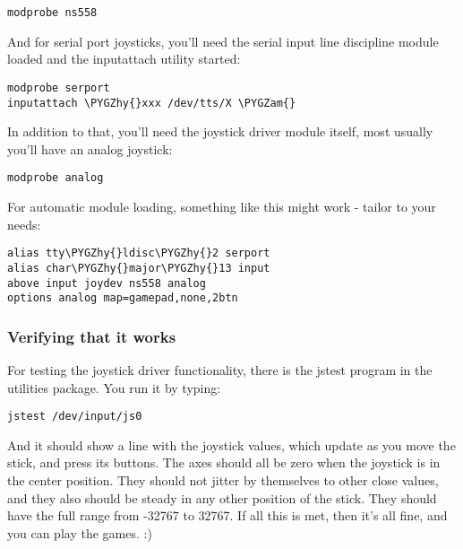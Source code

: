 \documentclass[a4paper,8pt,english]{sphinxmanual}
\def\PYGZam{\char`\&}
\def\PYGZhy{\char`\-}
\begin{document}
\begin{Verbatim}[commandchars=\\\{\}]
modprobe ns558
\end{Verbatim}

And for serial port joysticks, you'll need the serial input line
discipline module loaded and the inputattach utility started:

\begin{Verbatim}[commandchars=\\\{\}]
modprobe serport
inputattach \PYGZhy{}xxx /dev/tts/X \PYGZam{}
\end{Verbatim}

In addition to that, you'll need the joystick driver module itself, most
usually you'll have an analog joystick:

\begin{Verbatim}[commandchars=\\\{\}]
modprobe analog
\end{Verbatim}

For automatic module loading, something like this might work - tailor to
your needs:

\begin{Verbatim}[commandchars=\\\{\}]
alias tty\PYGZhy{}ldisc\PYGZhy{}2 serport
alias char\PYGZhy{}major\PYGZhy{}13 input
above input joydev ns558 analog
options analog map=gamepad,none,2btn
\end{Verbatim}


\subsubsection{Verifying that it works}
\label{input/joydev/joystick:verifying-that-it-works}
For testing the joystick driver functionality, there is the jstest
program in the utilities package. You run it by typing:

\begin{Verbatim}[commandchars=\\\{\}]
jstest /dev/input/js0
\end{Verbatim}

And it should show a line with the joystick values, which update as you
move the stick, and press its buttons. The axes should all be zero when the
joystick is in the center position. They should not jitter by themselves to
other close values, and they also should be steady in any other position of
the stick. They should have the full range from -32767 to 32767. If all this
is met, then it's all fine, and you can play the games. :)
\end{document}
